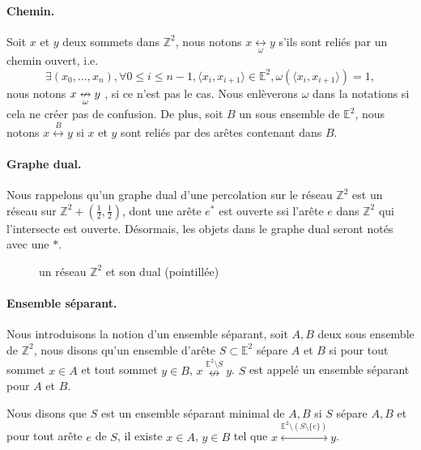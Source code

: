 \documentclass[titlepage,a4paper,12pt]{article}
\begin{document}
\paragraph{Chemin.}Soit $x$ et $y$ deux sommets dans $\mathbb{Z}^2$, nous notons $x\underset{\omega}{\longleftrightarrow} y$ s'ils sont reliés par un chemin ouvert, i.e.
$$ \exists (x_0,\dots,x_n), \forall 0\leqslant i\leqslant n-1, \langle x_i,x_{i+1}\rangle \in \mathbb{E}^2, \omega(\langle x_i,x_{i+1}\rangle) = 1,
$$
nous notons $\smash x\underset{\omega}{\nleftrightarrow} y$ , si ce n'est pas le cas. Nous enlèverons $\omega$ dans la notations si cela ne créer pas de confusion. De plus, soit $B$ un sous ensemble de $\mathbb{E}^2$, nous notons $x\overset{B}{\longleftrightarrow} y$ si $x$ et $y$ sont reliés par des arêtes contenant dans $B$.

\paragraph{Graphe dual.}Nous rappelons qu'un graphe dual d'une percolation sur le réseau $\mathbb{Z}^2$ est un réseau sur $\mathbb{Z}^2+(\frac{1}{2},\frac{1}{2})$, dont une arête $e^*$ est ouverte ssi l'arête $e$ dans $\mathbb{Z}^2$ qui l'intersecte est ouverte. Désormais, les objets dans le graphe dual seront notés avec une $*$.

\begin{figure}[h]
\center
{}
\caption{un réseau $\mathbb{Z}^2$ et son dual (pointillée)}
\end{figure}

\paragraph{Ensemble séparant.}Nous introduisons la notion d'un ensemble séparant, soit $A,B$ deux sous ensemble de $\mathbb{Z}^2$, nous disons qu'un ensemble d'arête $S\subset \mathbb{E}^2$ sépare $A$ et $B$ si pour tout sommet $x\in A$ et tout sommet $y\in B$, $x\overset{\mathbb{E}^2\setminus S}{\nleftrightarrow} y$. $S$ est appelé un ensemble séparant pour $A$ et $B$.

Nous disons que $S$ est un ensemble séparant minimal de $A,B$ si $S$ sépare $A,B$ et pour tout arête $e$ de $S$, il existe $x\in A$, $y\in B$ tel que $x\overset{\mathbb{E}^2\setminus (S\setminus \{e\})}{\longleftrightarrow} y$.
\end{document}
